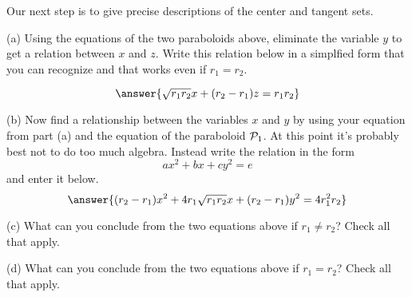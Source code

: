 \documentclass{ximera}
\begin{document}
\begin{question} \label{Q5r43rd:Spheres}

Our next step is to give precise descriptions of the center and tangent sets. %

(a) Using the equations of the two paraboloids above, eliminate the variable $y$ to get a relation between $x$ and $z$. Write this relation below in a simplfied form that you can recognize and that works even if $r_1 = r_2$.

\[
    \answer{\sqrt{r_1 r_2}x + (r_2 - r_1) z = r_1 r_2}
\]

(b) Now find a relationship between the variables $x$ and $y$ by using your equation from part (a) and the equation of the paraboloid ${\cal P}_1$. At this point it's probably best not to do too much algebra. Instead write the relation in the form 
\[
   ax^2 + bx + cy^2 = e 
\]
and enter it below.
\[
    \answer{(r_2 - r_1)x^2 + 4 r_1\sqrt{r_1r_2}x + (r_2-r_1)y^2 =  4r_1^2 r_2}
\]

(c) What can you conclude from the two equations above if $r_1\neq r_2$? Check all that apply.
 \begin{selectAll}  
  \end{selectAll}  

(d) What can you conclude from the two equations above if $r_1= r_2$? Check all that apply.
 \begin{selectAll}  
  \end{selectAll}



 
\begin{onlineOnly}
    \begin{center}
\end{center}
\end{onlineOnly}


\end{question}
\end{document}

